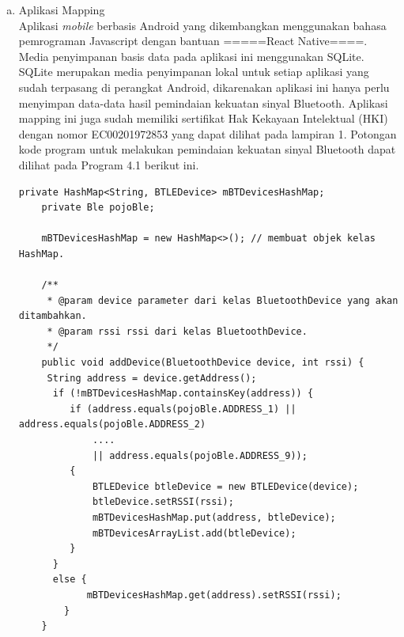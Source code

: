 \begin{enumerate}[a.]
\begin{enumerate}[a.]
\item Aplikasi Mapping
\\ Aplikasi \textit{mobile} berbasis Android yang dikembangkan menggunakan bahasa pemrograman Javascript dengan bantuan =====React Native====. Media penyimpanan basis data pada aplikasi ini menggunakan SQLite. SQLite merupakan media penyimpanan lokal untuk setiap aplikasi yang sudah terpasang di perangkat Android, dikarenakan aplikasi ini hanya perlu menyimpan data-data hasil pemindaian kekuatan sinyal Bluetooth. Aplikasi mapping ini juga sudah memiliki sertifikat Hak Kekayaan Intelektual (HKI) dengan nomor EC00201972853 yang dapat dilihat pada lampiran 1. Potongan kode program untuk melakukan pemindaian kekuatan sinyal Bluetooth dapat dilihat pada Program 4.1 berikut ini.
\vspace{0.4cm}
\begin{lstlisting}[label=programScanBle]
    private HashMap<String, BTLEDevice> mBTDevicesHashMap;
    private Ble pojoBle;

    mBTDevicesHashMap = new HashMap<>(); // membuat objek kelas HashMap.
	
	/**
     * @param device parameter dari kelas BluetoothDevice yang akan ditambahkan.
     * @param rssi rssi dari kelas BluetoothDevice.
     */
    public void addDevice(BluetoothDevice device, int rssi) {
     String address = device.getAddress();
      if (!mBTDevicesHashMap.containsKey(address)) {
         if (address.equals(pojoBle.ADDRESS_1) || address.equals(pojoBle.ADDRESS_2) 
             .... 
             || address.equals(pojoBle.ADDRESS_9));
         {
             BTLEDevice btleDevice = new BTLEDevice(device);
             btleDevice.setRSSI(rssi);
             mBTDevicesHashMap.put(address, btleDevice);
             mBTDevicesArrayList.add(btleDevice);
         }
      }
      else {
            mBTDevicesHashMap.get(address).setRSSI(rssi);
        }
    }
	\end{lstlisting}



\end{enumerate}
\end{enumerate}
